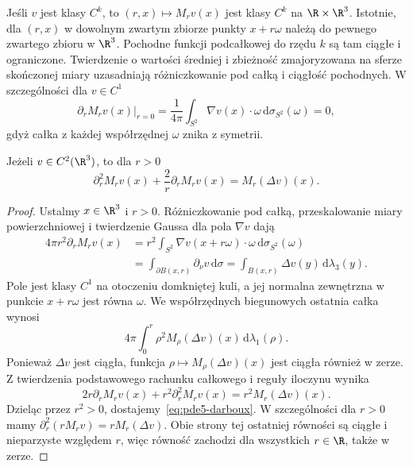 Jeśli $v$ jest klasy $C^k$, to $(r,x)\mapsto M_rv(x)$
jest klasy $C^k$ na $\R\times\R^3$.
Istotnie, dla $(r,x)$ w dowolnym zwartym zbiorze
punkty $x+r\omega$ należą do pewnego zwartego
zbioru w $\R^3$. Pochodne funkcji podcałkowej
do rzędu $k$ są tam ciągłe i ograniczone.
Twierdzenie o wartości średniej i zbieżność
zmajoryzowana na sferze skończonej miary uzasadniają
różniczkowanie pod całką i ciągłość pochodnych.
W szczególności dla $v\in C^1$
\[
 \left.\partial_rM_rv(x)\right|_{r=0}
 =\frac1{4\pi}\int_{S^2}\nabla v(x)\cdot\omega\,
 \mathrm d\sigma_{S^2}(\omega)=0,
\]
gdyż całka z każdej współrzędnej $\omega$ znika
z symetrii.

\begin{lemat}
\label{lem:pde5-darboux}
Jeżeli $v\in C^2(\R^3)$, to dla $r>0$
\begin{equation}\label{eq:pde5-darboux}
 \partial_r^2 M_rv(x)+\frac2r\partial_rM_rv(x)
 =M_r(\Delta v)(x).
\end{equation}
\end{lemat}
\begin{proof}
Ustalmy $x\in\R^3$ i $r>0$. Różniczkowanie
pod całką, przeskalowanie miary powierzchniowej
i twierdzenie Gaussa dla pola $\nabla v$ dają
\[
 \begin{aligned}
 4\pi r^2\partial_rM_rv(x)
 &=r^2\int_{S^2}\nabla v(x+r\omega)\cdot\omega\,
             \mathrm d\sigma_{S^2}(\omega)\\
 &=\int_{\partial B(x,r)}\partial_\nu v\,\mathrm d\sigma
 =\int_{B(x,r)}\Delta v(y)\,\mathrm d\lambda_3(y).
 \end{aligned}
\]
Pole jest klasy $C^1$ na otoczeniu domkniętej kuli,
a jej normalna zewnętrzna w punkcie $x+r\omega$
jest równa $\omega$.
We współrzędnych biegunowych ostatnia całka
wynosi
\[
 4\pi\int_0^r\rho^2 M_\rho(\Delta v)(x)\,
 \mathrm d\lambda_1(\rho).
\]
Ponieważ $\Delta v$ jest ciągła, funkcja
$\rho\mapsto M_\rho(\Delta v)(x)$ jest ciągła
również w zerze. Z twierdzenia podstawowego
rachunku całkowego i reguły iloczynu wynika
\[
 2r\partial_rM_rv(x)+r^2\partial_r^2M_rv(x)
 =r^2M_r(\Delta v)(x).
\]
Dzieląc przez $r^2>0$, dostajemy~\eqref{eq:pde5-darboux}.
W szczególności dla $r>0$ mamy
$\partial_r^2(rM_rv)=rM_r(\Delta v)$.
Obie strony tej ostatniej równości są ciągłe
i nieparzyste względem $r$, więc równość zachodzi
dla wszystkich $r\in\R$, także w zerze.
\end{proof}

